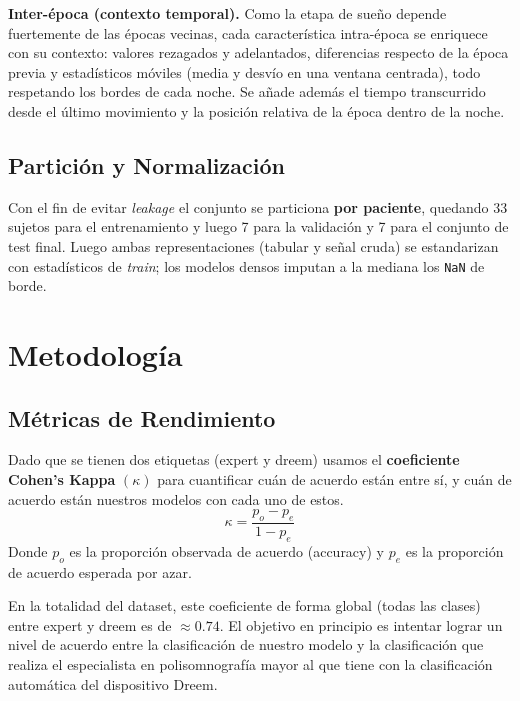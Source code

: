 \documentclass[conference]{IEEEtran}
\begin{document}
\textbf{Inter-época (contexto temporal).} Como la etapa de sueño depende fuertemente de las épocas vecinas, cada característica intra-época se enriquece con su contexto: valores rezagados y adelantados, diferencias respecto de la época previa y estadísticos móviles (media y desvío en una ventana centrada), todo respetando los bordes de cada noche. Se añade además el tiempo transcurrido desde el último movimiento y la posición relativa de la época dentro de la noche.

\subsection{Partición y Normalización}

Con el fin de evitar \emph{leakage} el conjunto se particiona \textbf{por paciente}, quedando 33 sujetos para el entrenamiento y luego 7 para la validación y 7 para el conjunto de test final. Luego ambas representaciones (tabular y señal cruda) se estandarizan con estadísticos de \emph{train}; los modelos densos imputan a la mediana los \texttt{NaN} de borde.

\section{Metodología}

\subsection{Métricas de Rendimiento}

Dado que se tienen dos etiquetas (expert y dreem) usamos el \textbf{coeficiente Cohen's Kappa} $(\kappa)$ \cite{cohen1960coefficient,landis1977measurement} para cuantificar cuán de acuerdo están entre sí, y cuán de acuerdo están nuestros modelos con cada uno de estos.
\begin{equation}
    \kappa = \frac{p_o - p_e}{1 - p_e}
    \label{eq:cohen-kappa}
\end{equation}
Donde $p_o$ es la proporción observada de acuerdo (accuracy) y $p_e$ es la proporción de acuerdo esperada por azar.

En la totalidad del dataset, este coeficiente de forma global (todas las clases) entre expert y dreem es de $\approx\!0.74$. El objetivo en principio es intentar lograr un nivel de acuerdo entre la clasificación de nuestro modelo y la clasificación que realiza el especialista en polisomnografía mayor al que tiene con la clasificación automática del dispositivo Dreem.
\end{document}
